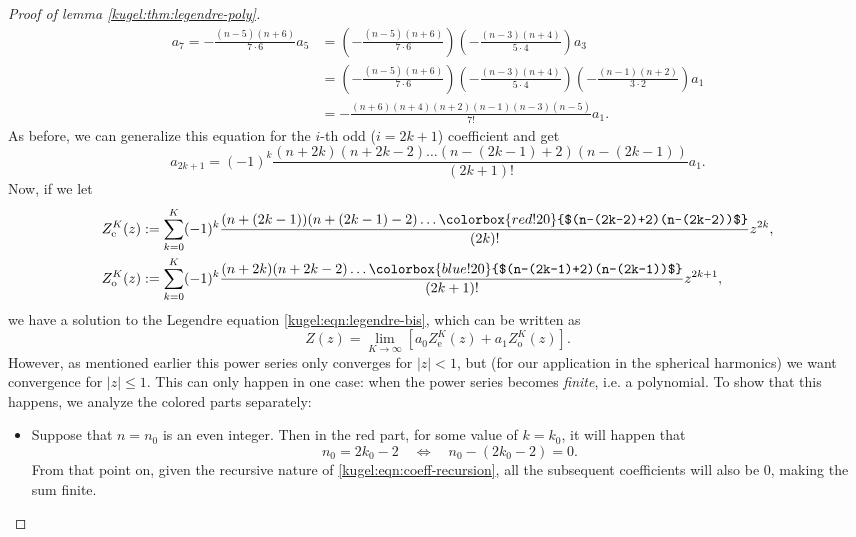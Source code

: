 \begin{proof}[Proof of lemma \ref{kugel:thm:legendre-poly}]
\begin{align*}
    a_{7} = -\frac{(n-5)(n+6)}{7\cdot 6} a_5
      &= \left( -\frac{(n-5)(n+6)}{7 \cdot 6} \right)
         \left( -\frac{(n-3)(n+4)}{5 \cdot 4} \right) a_3 \\
      &= \left( -\frac{(n-5)(n+6)}{7 \cdot 6} \right)
         \left( -\frac{(n-3)(n+4)}{5 \cdot 4} \right)
         \left( -\frac{(n-1)(n+2)}{3 \cdot 2} \right) a_1 \\
      &= -\frac{(n+6)(n+4)(n+2)(n-1)(n-3)(n-5)}{7!} a_1.
  \end{align*}
  As before, we can generalize this equation for the $i$-th odd ($i = 2k+1$)
  coefficient and get
  \begin{equation*}
    a_{2k+1} = (-1)^k \frac{(n + 2k)(n+2k-2)
      \hdots (n-(2k-1)+2)(n-(2k-1))}{(2k+1)!} a_1.
  \end{equation*}
  Now, if we let
  \begin{align*}
    Z_\text{e}^K(z) &:=
      \sum_{k=0}^K(-1)^k \frac{
        (n+(2k-1))(n+(2k-1)-2) \hdots
        \colorbox{red!20}{$(n-(2k-2)+2)(n-(2k-2))$}
      }{(2k)!} z^{2k}, \\
    Z_\text{o}^K(z) &:=
      \sum_{k=0}^K(-1)^k \frac{
        (n + 2k)(n+2k-2)\hdots \colorbox{blue!20}{$(n-(2k-1)+2)(n-(2k-1))$}
      }{(2k+1)!} z^{2k+1},
  \end{align*}
  we have a solution to the Legendre equation \eqref{kugel:eqn:legendre-bis},
  which can be written as
  \begin{equation} \label{kugel:eqn:legendre-powerseries}
    Z(z) = \lim_{K \to \infty} \left[
      a_0 Z_\text{e}^K(z) + a_1 Z_\text{o}^K(z)
    \right].
  \end{equation}
  However, as mentioned earlier this power series only converges for $|z| < 1$,
  but (for our application in the spherical harmonics) we want convergence for
  $|z| \leq 1$. This can only happen in one case: when the power series becomes
  \emph{finite}, i.e. a polynomial. To show that this happens, we analyze the
  colored parts separately:
  \begin{itemize}
    \item[\textcolor{red!80!black}{\textbullet}]
      Suppose that $n = n_0$ is an even integer. Then in the red part, for some
      value of $k=k_0$, it will happen that
      \begin{equation*}
        n_0 = 2 k_0 - 2
        \quad \iff \quad
        n_0-(2k_0-2)=0.
      \end{equation*}
      From that point on, given the recursive nature of
      \eqref{kugel:eqn:coeff-recursion}, all the subsequent coefficients will
      also be 0, making the sum finite.


\end{itemize}
\end{proof}
